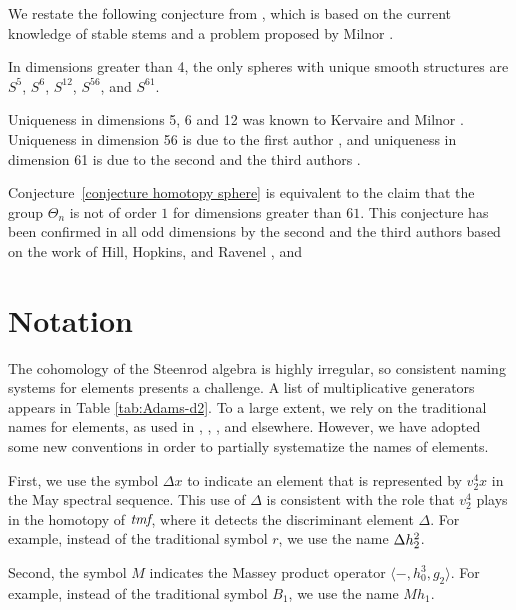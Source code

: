We restate the following conjecture from \cite{WangXu17}, which is based on the current knowledge of stable stems and a problem proposed by Milnor \cite{Milnor}.

\begin{conj}\label{conjecture homotopy sphere}
In dimensions greater than 4, the only spheres with unique smooth structures are $S^5$, $S^6$, $S^{12}$, $S^{56}$, and $S^{61}$.	
\end{conj}

Uniqueness in
dimensions 5, 6 and 12 was known to Kervaire and Milnor \cite{KervaireMilnor}. 
Uniqueness in dimension 56 is due to the first author \cite{Isaksen14c}, 
and uniqueness in dimension 61 is due to the second and the third authors \cite{WangXu17}. 

Conjecture~\ref{conjecture homotopy sphere} is equivalent to the claim
that the group $\Theta_n$ is not of order $1$ for dimensions greater than $61$. This conjecture has been confirmed in all odd dimensions by the second and the third authors \cite{WangXu17} based on the work of Hill, Hopkins, and Ravenel \cite{HHR}, and 




\section{Notation}
\label{sctn:notation}

The cohomology of the Steenrod algebra is highly irregular, so
consistent naming systems for elements presents a challenge.
A list of multiplicative generators appears in Table \ref{tab:Adams-d2}.
To a large extent, we rely on the traditional names for elements,
as used in \cite{Bruner97}, \cite{Isaksen14c}, \cite{Tangora70a},
and elsewhere.  However, we have adopted some new conventions 
in order to partially systematize the names of elements.

First, we use the symbol $\Delta x$ to indicate an element that is
represented by $v_2^4 x$ in the May spectral sequence.  This use of
$\Delta$ is consistent with the role that $v_2^4$ plays in the homotopy
of $\textit{tmf}$, where it detects the discriminant element $\Delta$.
For example, instead of the traditional symbol $r$, we use the
name $\Delta h_2^2$.

Second, the symbol $M$ indicates the Massey product
operator $\langle -, h_0^3, g_2 \rangle$.  For example, instead of the
traditional symbol $B_1$, we use the name $M h_1$.

